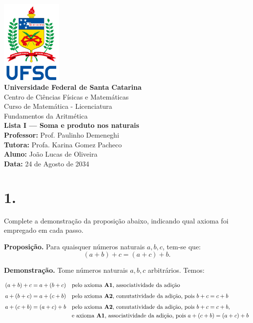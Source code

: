 \documentclass[12pt,a4paper]{article}
\newcommand{\universidade}{Universidade Federal de Santa Catarina}
\newcommand{\centro}{Centro de Ciências Físicas e Matemáticas}
\newcommand{\curso}{Curso de Matemática - Licenciatura}
\newcommand{\disciplina}{Fundamentos da Aritmética}
\newcommand{\professor}{Prof. Paulinho Demeneghi}
\newcommand{\tutora}{Profa. Karina Gomez Pacheco}
\newcommand{\autor}{João Lucas de Oliveira}
\newcommand{\dataentrega}{24 de Agosto de 2034}
\begin{document}
\begin{center}
    \includegraphics[width=3cm]{ufsc_logo}\\[0.3cm]
    \textbf{\universidade}\\
    \centro\\
    \curso\\[1cm]
    \disciplina\\
    \textbf{Lista I — Soma e produto nos naturais}\\[0.5cm]
    \textbf{Professor:} \professor \\
    \textbf{Tutora:} \tutora \\
    \textbf{Aluno:} \autor \\
    \textbf{Data:} \dataentrega
\end{center}

\vspace{1cm}

\section*{1.}
Complete a demonstração da proposição abaixo, indicando qual axioma foi empregado em cada passo.

\medskip

\textbf{Proposição.} Para quaisquer números naturais $a, b, c$, tem-se que:
\[
(a + b) + c = (a + c) + b.
\]

\textbf{Demonstração.} Tome números naturais $a, b, c$ arbitrários. Temos:

\[
\begin{aligned}
(a + b) + c &= a + (b + c) 
&& \text{pelo axioma \textbf{A1}, associatividade da adição} \\[4pt]
a + (b + c) &= a + (c + b) 
&& \text{pelo axioma \textbf{A2}, comutatividade da adição, pois } b + c = c + b \\[4pt]
a + (c + b) &= (a + c) + b 
&& \text{pelo axioma \textbf{A2}, comutatividade da adição, pois } b + c = c + b, \\
&&& \text{e axioma \textbf{A1}, associatividade da adição, pois } a + (c + b) = (a + c) + b
\end{aligned}
\]
\end{document}
